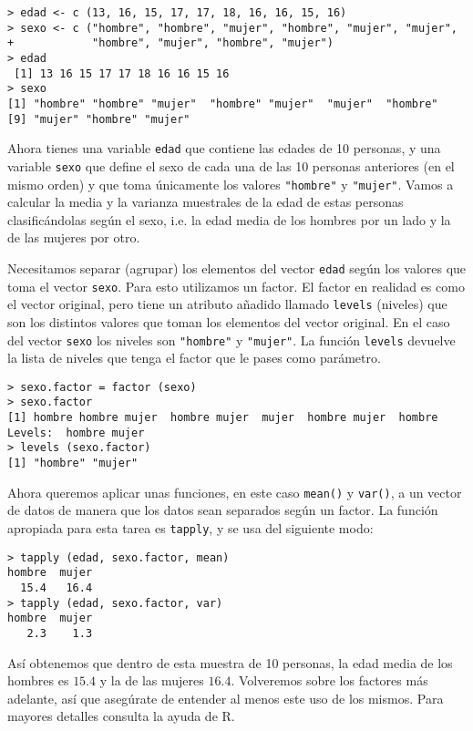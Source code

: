 \begin{verbatim}
> edad <- c (13, 16, 15, 17, 17, 18, 16, 16, 15, 16)
> sexo <- c ("hombre", "hombre", "mujer", "hombre", "mujer", "mujer",         
+            "hombre", "mujer", "hombre", "mujer") 
> edad
 [1] 13 16 15 17 17 18 16 16 15 16
> sexo
[1] "hombre" "hombre" "mujer"  "hombre" "mujer"  "mujer"  "hombre" 
[9] "mujer" "hombre" "mujer"
\end{verbatim}

Ahora tienes  una variable {\tt  edad} que  contiene las edades  de 10
personas, y  una variable {\tt  sexo} que define  el sexo de  cada una
de  las  10  personas  anteriores  (en el  mismo  orden)  y  que  toma
únicamente  los  valores  \verb|"hombre"| y  \verb|"mujer"|.  Vamos  a
calcular  la media  y  la  varianza muestrales  de  la  edad de  estas
personas  clasificándolas según  el sexo,  i.e. la  edad media  de los
hombres por un lado y la de las mujeres por otro.

Necesitamos  separar (agrupar)  los  elementos del  vector {\tt  edad}
según los valores que toma el  vector {\tt sexo}. Para esto utilizamos
un factor.  El factor  en realidad  es como  el vector  original, pero
tiene un atributo  añadido llamado {\tt levels} (niveles)  que son los
distintos  valores que  toman los  elementos del  vector original.  En
el  caso del  vector  {\tt  sexo} los  niveles  son \verb|"hombre"|  y
\verb|"mujer"|. La función  {\tt levels} devuelve la  lista de niveles
que tenga el factor que le pases como parámetro.

\begin{verbatim}
> sexo.factor = factor (sexo)
> sexo.factor
[1] hombre hombre mujer  hombre mujer  mujer  hombre mujer  hombre
Levels:  hombre mujer 
> levels (sexo.factor)
[1] "hombre" "mujer"
\end{verbatim}

Ahora queremos  aplicar unas  funciones, en este  caso {\tt  mean()} y
{\tt  var()}, a  un  vector de  datos  de manera  que  los datos  sean
separados según  un factor.  La función apropiada  para esta  tarea es
{\tt tapply}, y se usa del siguiente modo:


\begin{verbatim}
> tapply (edad, sexo.factor, mean)
hombre  mujer 
  15.4   16.4 
> tapply (edad, sexo.factor, var)
hombre  mujer 
   2.3    1.3
\end{verbatim}

Así obtenemos que dentro de esta muestra de 10 personas, la edad media
de los hombres es $15.4$ y  la de las mujeres $16.4$. Volveremos sobre
los factores más adelante, así que asegúrate de entender al menos este
uso de los mismos. Para mayores detalles consulta la ayuda de {\sf R}.

